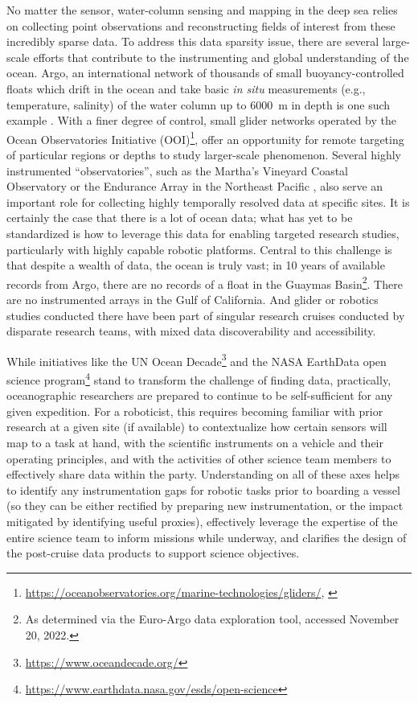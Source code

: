 No matter the sensor, water-column sensing and mapping in the deep sea relies on collecting point observations and reconstructing fields of interest from these incredibly sparse data.
To address this data sparsity issue, there are several large-scale efforts that contribute to the instrumenting and global understanding of the ocean. Argo, an international network of thousands of small buoyancy-controlled floats which drift in the ocean and take basic \emph{in situ} measurements (e.g., temperature, salinity) of the water column up to \SI{6000}{\meter} in depth is one such example \autocite{roemmich2009argo,jayne2017argo}. With a finer degree of control, small glider networks operated by the Ocean Observatories Initiative (OOI)\footnote{\url{https://oceanobservatories.org/marine-technologies/gliders/}, \cite{trowbridge2019ocean}}, offer an opportunity for remote targeting of particular regions or depths to study larger-scale phenomenon. Several highly instrumented ``observatories'', such as the Martha's Vineyard Coastal Observatory \autocite{austin2000martha} or the Endurance Array in the Northeast Pacific \autocite{barth2018warm}, also serve an important role for collecting highly temporally resolved data at specific sites. It is certainly the case that there is a lot of ocean data; what has yet to be standardized is how to leverage this data for enabling targeted research studies, particularly with highly capable robotic platforms. Central to this challenge is that despite a wealth of data, the ocean is truly vast; in 10 years of available records from Argo, there are no records of a float in the Guaymas Basin\footnote{As determined via the Euro-Argo data exploration tool, accessed November 20, 2022.}. There are no instrumented arrays in the Gulf of California. And glider or robotics studies conducted there have been part of singular research cruises conducted by disparate research teams, with mixed data discoverability and accessibility. 

While initiatives like the UN Ocean Decade\footnote{\url{https://www.oceandecade.org/}} and the NASA EarthData open science program\footnote{\url{https://www.earthdata.nasa.gov/esds/open-science}} stand to transform the challenge of finding data, practically, oceanographic researchers are prepared to continue to be self-sufficient for any given expedition.
For a roboticist, this requires becoming familiar with prior research at a given site (if available) to contextualize how certain sensors will map to a task at hand, with the scientific instruments on a vehicle and their operating principles, and with the activities of other science team members to effectively share data within the party. Understanding on all of these axes helps to identify any instrumentation gaps for robotic tasks prior to boarding a vessel (so they can be either rectified by preparing new instrumentation, or the impact mitigated by identifying useful proxies), effectively leverage the expertise of the entire science team to inform missions while underway, and clarifies the design of the post-cruise data products to support science objectives.

